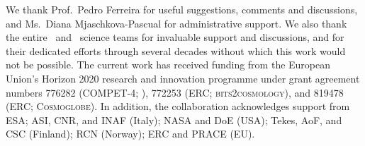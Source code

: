 \begin{acknowledgements}
  We thank Prof.\ Pedro Ferreira for useful suggestions, comments and
  discussions, and Ms.\ Diana Mjaschkova-Pascual for administrative
  support. We also thank the entire \Planck\ and \WMAP\ science teams
  for invaluable support and discussions, and for their dedicated
  efforts through several decades without which this work would not be
  possible. The current work has received funding from the European
  Union’s Horizon 2020 research and innovation programme under grant
  agreement numbers 776282 (COMPET-4; \BP), 772253 (ERC;
  \textsc{bits2cosmology}), and 819478 (ERC; \textsc{Cosmoglobe}). In
  addition, the collaboration acknowledges support from ESA; ASI, CNR,
  and INAF (Italy); NASA and DoE (USA); Tekes, AoF, and CSC (Finland);
  RCN (Norway); ERC and PRACE (EU).
\end{acknowledgements}
